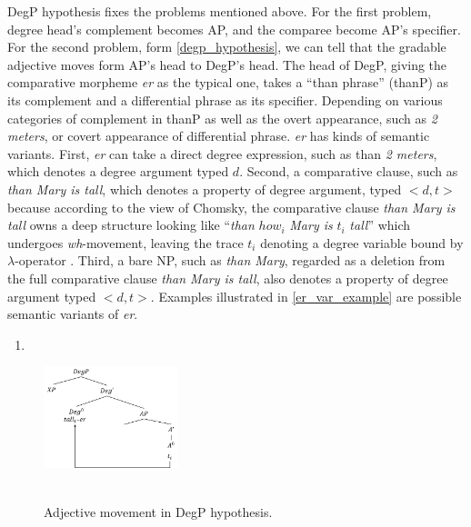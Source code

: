 \documentclass{ctexart}
\let \cite \parencite
\begin{document}
DegP hypothesis fixes the problems mentioned above. For the first problem, degree head's complement becomes AP, and the comparee become AP's specifier. For the second problem, form \ref{degp_hypothesis}, we can tell that the gradable adjective moves form AP's head to DegP's head. The head of DegP, giving the comparative morpheme \textit{er} as the typical one, takes a ``than phrase'' (thanP) as its complement and a differential phrase as its specifier. Depending on various categories of complement in thanP as well as the overt appearance, such as \textit{2 meters}, or covert appearance of differential phrase. \textit{er} has kinds of semantic variants. First, \textit{er} can take a direct degree expression, such as than \textit{2 meters}, which denotes a degree argument typed $d$. Second, a comparative clause, such as \textit{than Mary is tall}, which denotes a property of degree argument, typed $<d,t>$ because according to the view of Chomsky, the comparative clause \textit{than Mary is tall} owns a deep structure looking like ``\textit{than} $how_i$ \textit{Mary is} $t_i$ \textit{tall}'' which undergoes \textit{wh}-movement, leaving the trace $t_i$ denoting a degree variable bound by $\lambda$-operator \cite{chomsky1977}. Third, a bare NP, such as \textit{than Mary}, regarded as a deletion from the full comparative clause \textit{than Mary is tall}, also denotes a property of degree argument typed $<d,t>$. Examples illustrated in \ref{er_var_example} are possible semantic variants of \textit{er}.

\begin{enumerate}
    \item \label{degp_hypothesis}
\end{enumerate}

\begin{figure}[H]
    \centering
    \includegraphics[width=0.35\textwidth]{Pic/degP_hy.png}
    \begin{caption}
        \\ \vspace{-1.1ex}
        Adjective movement in DegP hypothesis.
    \end{caption}
\end{figure}
\end{document}
